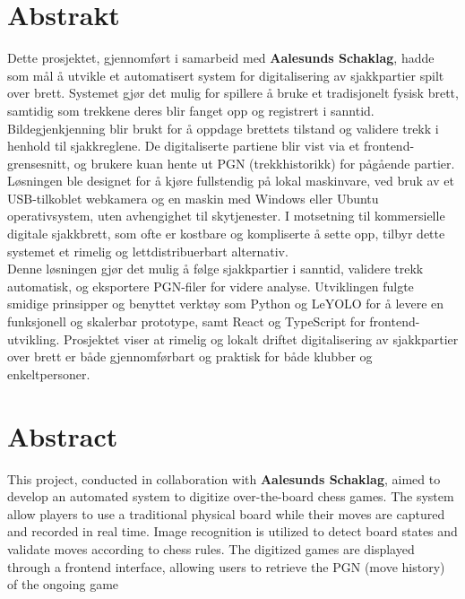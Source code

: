 \chapter*{Abstrakt}

Dette prosjektet, gjennomført i samarbeid med \textbf{Aalesunds Schaklag}, hadde som mål å utvikle et automatisert system for digitalisering av sjakkpartier spilt over brett. Systemet gjør det mulig for spillere å bruke et tradisjonelt fysisk brett, samtidig som trekkene deres blir fanget opp og registrert i sanntid. Bildegjenkjenning blir brukt for å oppdage brettets tilstand og validere trekk i henhold til sjakkreglene. De digitaliserte partiene blir vist via et frontend-grensesnitt, og brukere kuan hente ut PGN (trekkhistorikk) for pågående partier. \\

Løsningen ble designet for å kjøre fullstendig på lokal maskinvare, ved bruk av et USB-tilkoblet webkamera og en maskin med Windows eller Ubuntu operativsystem, uten avhengighet til skytjenester. I motsetning til kommersielle digitale sjakkbrett, som ofte er kostbare og kompliserte å sette opp, tilbyr dette systemet et rimelig og lettdistribuerbart alternativ. \\

Denne løsningen gjør det mulig å følge sjakkpartier i sanntid, validere trekk automatisk, og eksportere PGN-filer for videre analyse. Utviklingen fulgte smidige prinsipper og benyttet verktøy som Python og LeYOLO for å levere en funksjonell og skalerbar prototype, samt React og TypeScript for frontend-utvikling. Prosjektet viser at rimelig og lokalt driftet digitalisering av sjakkpartier over brett er både gjennomførbart og praktisk for både klubber og enkeltpersoner.

\chapter*{Abstract}
This project, conducted in collaboration with \textbf{Aalesunds Schaklag}, aimed to develop an automated system to digitize over-the-board chess games. The system allow players to use a traditional physical board while their moves are captured and recorded in real time. Image recognition is utilized to detect board states and validate moves according to chess rules. The digitized games are displayed through a frontend interface, allowing users to retrieve the PGN (move history) of the ongoing game \\

